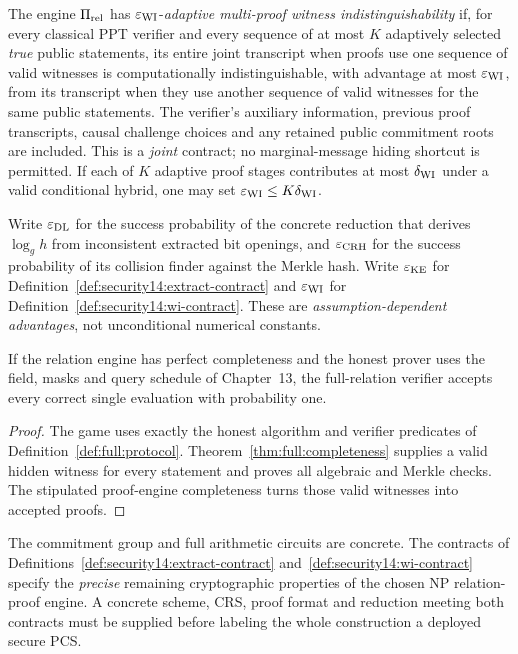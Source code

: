\begin{definition}\label{def:security14:wi-contract}
The engine $\Pi_{\rm rel}$ has
$\varepsilon_{\rm WI}$-\emph{adaptive
multi-proof witness indistinguishability}
if, for every classical PPT verifier and
every sequence of at most $K$ adaptively
selected \emph{true} public statements,
its entire joint transcript when proofs
use one sequence of valid witnesses is
computationally indistinguishable,
with advantage at most
$\varepsilon_{\rm WI}$, from its
transcript when they use another sequence
of valid witnesses for the same public
statements. The verifier's auxiliary
information, previous proof transcripts,
causal challenge choices and any retained
public commitment roots are included.
This is a \emph{joint} contract; no
marginal-message hiding shortcut
is permitted. If each of $K$ adaptive
proof stages contributes at most
$\delta_{\rm WI}$ under a valid
conditional hybrid, one may set
$\varepsilon_{\rm WI}\le K\delta_{\rm WI}$.
\end{definition}

\begin{definition}\label{def:security14:errors}
Write $\varepsilon_{\rm DL}$ for the
success probability of the concrete
reduction that derives
$\log_g h$ from inconsistent extracted
bit openings, and
$\varepsilon_{\rm CRH}$ for the
success probability of its collision
finder against the Merkle hash.
Write $\varepsilon_{\rm KE}$ for
Definition~\ref{def:security14:extract-contract}
and $\varepsilon_{\rm WI}$ for
Definition~\ref{def:security14:wi-contract}.
These are \emph{assumption-dependent
advantages}, not unconditional
numerical constants.
\end{definition}

\begin{lemma}\label{lem:security14:complete}
If the relation engine has perfect
completeness and the honest prover
uses the field, masks and query
schedule of Chapter~13, the
full-relation verifier accepts every
correct single evaluation with
probability one.
\end{lemma}
\begin{proof}
The game uses exactly the honest
algorithm and verifier predicates
of Definition~\ref{def:full:protocol}.
Theorem~\ref{thm:full:completeness}
supplies a valid hidden witness
for every statement and proves
all algebraic and Merkle checks.
The stipulated proof-engine
completeness turns those valid
witnesses into accepted proofs.
\end{proof}

\begin{remark}
The commitment group and full arithmetic
circuits are concrete. The contracts
of Definitions~\ref{def:security14:extract-contract}
and~\ref{def:security14:wi-contract}
specify the \emph{precise} remaining
cryptographic properties of the
chosen NP relation-proof engine.
A concrete scheme, CRS, proof format
and reduction meeting both contracts
must be supplied before labeling the
whole construction a deployed secure PCS.
\end{remark}
